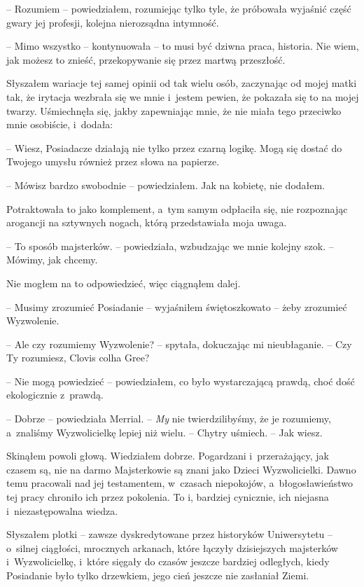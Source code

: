\documentclass[oneside,polish,11pt,sfheadings]{mwbk}
\begin{document}
-- Rozumiem -- powiedziałem, rozumiejąc tylko tyle, że próbowała wyjaśnić
część gwary jej profesji, kolejna nierozsądna intymność.

-- Mimo wszystko -- kontynuowała -- to musi być dziwna praca, historia. Nie
wiem, jak możesz to znieść, przekopywanie się przez martwą przeszłość.

Słyszałem wariacje tej samej opinii od tak wielu osób, zaczynając od
mojej matki tak, że irytacja wezbrała się we mnie i~jestem pewien, że
pokazała się to na mojej twarzy. Uśmiechnęła się, jakby zapewniając
mnie, że nie miała tego przeciwko mnie osobiście, i~dodała: 

-- Wiesz, Posiadacze działają nie tylko przez czarną logikę. Mogą się dostać do
Twojego umysłu również przez słowa na papierze.

-- Mówisz bardzo swobodnie -- powiedziałem. Jak na kobietę, nie dodałem.

Potraktowała to jako komplement, a~tym samym odpłaciła się, nie
rozpoznając arogancji na sztywnych nogach, którą przedstawiała moja
uwaga.

-- To sposób majsterków. -- powiedziała, wzbudzając we mnie kolejny szok.
-- Mówimy, jak chcemy.

Nie mogłem na to odpowiedzieć, więc ciągnąłem dalej.

-- Musimy zrozumieć Posiadanie -- wyjaśniłem świętoszkowato -- żeby
zrozumieć Wyzwolenie.

-- Ale czy rozumiemy Wyzwolenie? -- spytała, dokuczając mi nieubłaganie. -- Czy Ty rozumiesz, Clovis colha Gree?

-- Nie mogą powiedzieć -- powiedziałem, co było wystarczającą prawdą, choć
dość ekologicznie z~prawdą.

-- Dobrze -- powiedziała Merrial. -- \textit{My} nie twierdzilibyśmy, że je
rozumiemy, a~znaliśmy Wyzwolicielkę lepiej niż wielu. -- Chytry uśmiech.
-- Jak wiesz.

Skinąłem powoli głową. Wiedziałem dobrze. Pogardzani i~przerażający,
jak czasem są, nie na darmo Majsterkowie są znani jako Dzieci
Wyzwolicielki. Dawno temu pracowali nad jej testamentem, w~czasach
niepokojów, a~błogosławieństwo tej pracy chroniło ich przez pokolenia.
To i, bardziej cynicznie, ich niejasna i~niezastępowalna wiedza.

Słyszałem plotki -- zawsze dyskredytowane przez historyków Uniwersytetu -- o~silnej ciągłości, mrocznych arkanach, które łączyły dzisiejszych
majsterków i~Wyzwolicielkę, i~które sięgały do czasów jeszcze bardziej
odległych, kiedy Posiadanie było tylko drzewkiem, jego cień jeszcze nie
zasłaniał Ziemi.
\end{document}
